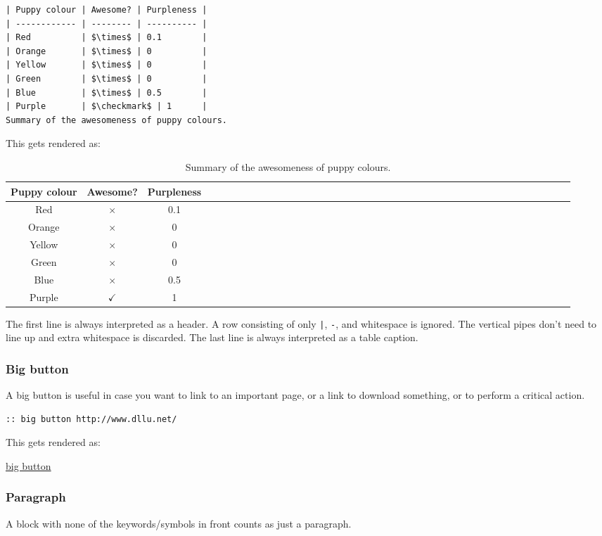 \begin{lstlisting}
| Puppy colour | Awesome? | Purpleness |
| ------------ | -------- | ---------- |
| Red          | $\times$ | 0.1        |
| Orange       | $\times$ | 0          |
| Yellow       | $\times$ | 0          |
| Green        | $\times$ | 0          |
| Blue         | $\times$ | 0.5        |
| Purple       | $\checkmark$ | 1      |
Summary of the awesomeness of puppy colours.
\end{lstlisting}
This gets rendered as:

\begin{table}[h]
\centering
\begin{tabular}{cccccccccccccccccccccccccccccccccccccccc}
Puppy colour & Awesome? & Purpleness\\ \hline
Red & $\times$ & 0.1\\
Orange & $\times$ & 0\\
Yellow & $\times$ & 0\\
Green & $\times$ & 0\\
Blue & $\times$ & 0.5\\
Purple & $\checkmark$ & 1\\
\end{tabular}
\caption{Summary of the awesomeness of puppy colours.}
\label{table1}\end{table}The first line is always interpreted as a header. A row consisting of only \texttt{|}, \texttt{-}, and whitespace is ignored. The vertical pipes don't need to line up and extra whitespace is discarded. The last line is always interpreted as a table caption.

\subsubsection{Big button}
\label{s2.3.7}
A big button is useful in case you want to link to an important page, or a link to download something, or to perform a critical action.

\begin{lstlisting}
:: big button http://www.dllu.net/
\end{lstlisting}
This gets rendered as:

\begin{center}\huge \href{http://www.dllu.net/}{big button}\end{center}
\subsubsection{Paragraph}
\label{s2.3.8}
A block with none of the keywords/symbols in front counts as just a paragraph.

